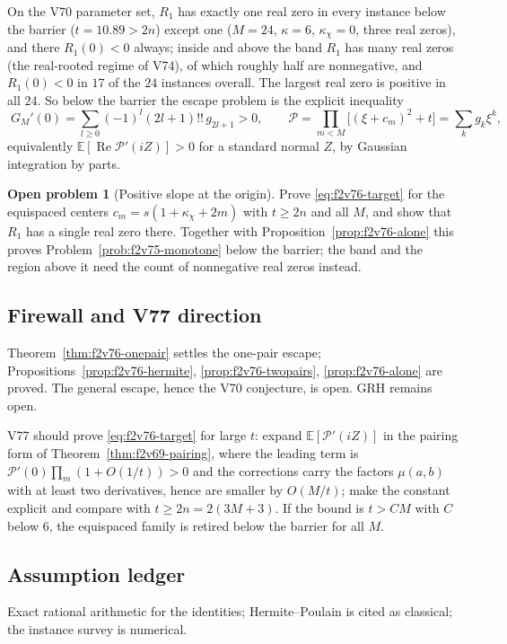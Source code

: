 \documentclass[11pt]{article}
\theoremstyle{definition}
\newtheorem{problem}[theorem]{Open problem}
\theoremstyle{remark}
\begin{document}
On the V70 parameter set, \(R_1\) has exactly one real zero in every
instance below the barrier (\(t=10.89>2n\)) except one (\(M=24\),
\(\kappa=6\), \(\kappa_\chi=0\), three real zeros), and there
\(R_1(0)<0\) always; inside and above the band \(R_1\) has many real
zeros (the real-rooted regime of V74), of which roughly half are
nonnegative, and \(R_1(0)<0\) in \(17\) of the \(24\) instances overall.
The largest real zero is positive in all \(24\).  So below the barrier
the escape problem is the explicit inequality
\begin{equation}
 \boxed{\;G_M'(0)=\sum_{l\ge0}(-1)^l(2l+1)!!\,g_{2l+1}>0,\qquad
 \mathcal P=\prod_{m<M}\bigl[(\xi+c_m)^2+t\bigr]=\sum_kg_k\xi^k,\;}
 \label{eq:f2v76-target}
\end{equation}
equivalently \(\mathbb E[\operatorname{Re}\mathcal P'(iZ)]>0\) for a
standard normal \(Z\), by Gaussian integration by parts.

\begin{problem}[Positive slope at the origin]
\label{prob:f2v76-slope}
Prove \eqref{eq:f2v76-target} for the equispaced centers
\(c_m=s(1+\kappa_\chi+2m)\) with \(t\ge2n\) and all \(M\), and show that
\(R_1\) has a single real zero there.  Together with
Proposition~\ref{prop:f2v76-alone} this proves
Problem~\ref{prob:f2v75-monotone} below the barrier; the band and the
region above it need the count of nonnegative real zeros instead.
\end{problem}

\subsection*{Firewall and V77 direction}
\label{fire:f2v76}
Theorem~\ref{thm:f2v76-onepair} settles the one-pair escape;
Propositions~\ref{prop:f2v76-hermite}, \ref{prop:f2v76-twopairs},
\ref{prop:f2v76-alone} are proved.  The general escape, hence the V70
conjecture, is open.  GRH remains open.

V77 should prove \eqref{eq:f2v76-target} for large \(t\): expand
\(\mathbb E[\mathcal P'(iZ)]\) in the pairing form of
Theorem~\ref{thm:f2v69-pairing}, where the leading term is
\(\mathcal P'(0)\prod_m(1+O(1/t))>0\) and the corrections carry the
factors \(\mu(a,b)\) with at least two derivatives, hence are smaller by
\(O(M/t)\); make the constant explicit and compare with \(t\ge2n=2(3M+3)\).
If the bound is \(t>CM\) with \(C\) below \(6\), the equispaced family is
retired below the barrier for all \(M\).

\subsection*{Assumption ledger}
\label{ass:f2v76}
Exact rational arithmetic for the identities; Hermite--Poulain is cited
as classical; the instance survey is numerical.
\endgroup
\end{document}
